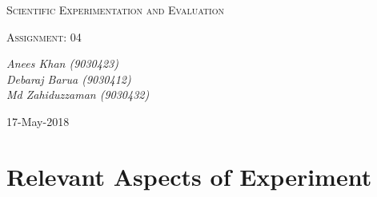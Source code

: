 \documentclass[10pt,a4paper]{article}
\begin{document}
			\begin{titlepage}
			\centering
		
				{\scshape\LARGE Scientific Experimentation and Evaluation\par}
		
				{\scshape\Large Assignment: 04\par}
		
				\vfill
		
				\vfill
				{\Large\itshape Anees Khan (9030423)
					\\Debaraj Barua (9030412)\\
					Md Zahiduzzaman (9030432)
					\par}
				\vfill
		
				{\large 17-May-2018\par}
			\end{titlepage}
			\tableofcontents
			\listoffigures	
			\listoftables
			\newpage
			\section{Relevant Aspects of Experiment}
\end{document}
